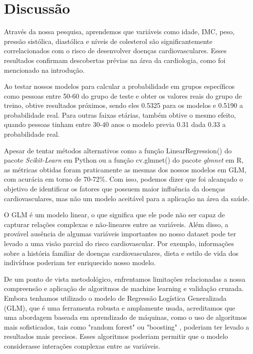 \documentclass[article,11pt,a4paper,brazil]{abntex2}
\begin{document}
	
	\section{Discussão}
	Através da nossa pesquisa, aprendemos que variáveis como idade, IMC, peso, pressão sistólica, diastólica e níveis de colesterol são significantemente correlacionados com o risco de desenvolver doenças cardiovasculares. Esses resultados confirmam descobertas prévias na área da cardiologia, como foi mencionado na introdução.
	
	Ao testar nossos modelos para calcular a probabilidade em grupos específicos como pessoas entre 50-60 do grupo de teste e obter os valores reais do grupo de treino, obtive resultados próximos, sendo eles 0.5325 para os modelos e 0.5190 a probabilidade real.  Para outras faixas etárias, também obtive o mesmo efeito, quando pessoas tinham entre 30-40 anos o modelo previa 0.31 dada 0.33 a probabilidade real.
	
	Apesar de tentar métodos alternativos como a função LinearRegression() do pacote \textit{Scikit-Learn} em Python ou a função cv.glmnet() do pacote \textit{glmnet} em R, as métricas obtidas foram praticamente as mesmas dos nossos modelos em GLM, com acurácia em torno de 70-72\%. Com isso, podemos dizer que foi alcançado o objetivo de identificar os fatores que possuem maior
	influência da doenças cardiovasculares, mas não um modelo aceitável para a aplicação na área da saúde.
	
	O GLM é um modelo linear, o que significa que ele pode não ser capaz de capturar relações complexas e não-lineares entre as variáveis. Além disso, a provável ausência de algumas variáveis importantes no nosso dataset pode ter levado a uma visão parcial do risco cardiovascular. Por exemplo, informações sobre a história familiar de doenças cardiovasculares, dieta \cite{cervato1997dieta} e estilo de vida dos indivíduos poderiam ter enriquecido nosso modelo. 
	
	De um ponto de vista metodológico, enfrentamos limitações relacionadas a nossa compreensão e aplicação de algoritmos de machine learning e validação cruzada. Embora tenhamos utilizado o modelo de Regressão Logística Generalizada (GLM), que é uma ferramenta robusta e amplamente usada, acreditamos que uma abordagem baseada em aprendizado de máquinas, como o uso de algoritmos mais sofisticados, tais como "random forest" ou "boosting" \cite{santos2022analise}, poderiam ter levado a resultados mais precisos. Esses algoritmos poderiam permitir que o modelo considerasse interações complexas entre as variáveis.
	
\end{document}
